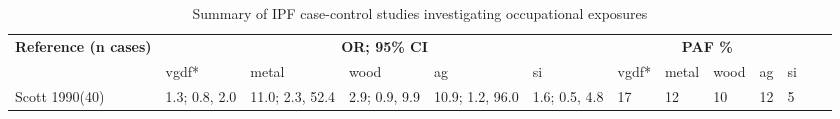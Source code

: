 \documentclass[12pt,a4paper,]{report}
\begin{document}
\begin{table}[htbp]\centering
\caption{Summary of IPF case-control studies investigating occupational exposures}
\label{metatable1}
\small
    \begin{tabular}{|p{1.5cm}|p{0.5cm}p{0.5cm}p{0.5cm}p{0.5cm}p{0.5cm}|p{0.5cm}p{0.5cm}p{0.5cm}p{0.5cm}p{0.5cm}|p{2.5cm}|p{2cm}|}
\midrule
\textbf{Reference (n cases)} & \multicolumn{5}{c}{\textbf{OR; 95\% CI}} & \multicolumn{5}{c}{\textbf{PAF \%}}  \\
        & vgdf* & metal & wood & ag & si & vgdf* & metal & wood & ag & si  \\
\toprule
        Scott 1990(40)\cite{Scott1990}                   & 1.3; 0.8, 2.0 & 11.0; 2.3, 52.4 & 2.9; 0.9, 9.9 & 10.9; 1.2, 96.0 & 1.6; 0.5, 4.8 & 17 & 12 & 10 & 12 & 5   \\
\hline


\end{tabular}
\end{table}
\end{document}
